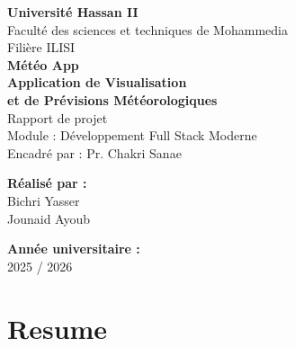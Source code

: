 \documentclass[12pt,a4paper]{article}
\begin{document}
\begin{titlepage}
\begin{center}
\vspace*{2cm}

{\large \textbf{Université Hassan II}}\\[0.5cm]
{\large Faculté des sciences et techniques de Mohammedia}\\[0.5cm]
{\large Filière ILISI}\\[2cm]

{\Huge \textbf{Météo App}}\\[0.3cm]
{\Large \textbf{Application de Visualisation}}\\[0.1cm]
{\Large \textbf{et de Prévisions Météorologiques}}\\[1cm]

{\large Rapport de projet}\\[0.2cm]
{\large Module : Développement Full Stack Moderne}\\[0.2cm]
{\large Encadré par : Pr. Chakri Sanae}\\[2cm]

\vfill

\begin{minipage}[t]{0.45\textwidth}
\centering
\textbf{Réalisé par :}\\[0.3cm]
Bichri Yasser\\[0.1cm]
Jounaid Ayoub
\end{minipage}
\hfill
\begin{minipage}[t]{0.45\textwidth}
\centering
\textbf{Année universitaire :}\\[0.3cm]
2025 / 2026
\end{minipage}

\vspace{1.5cm}

\end{center}
\end{titlepage}

\newpage
\section*{Resume}


\begin{center}
\end{center}
\end{document}
